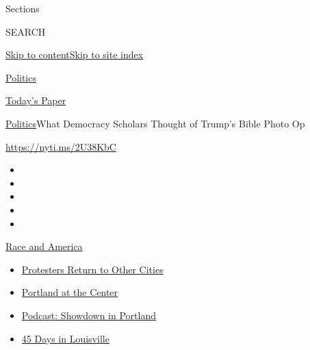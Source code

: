 Sections

SEARCH

\protect\hyperlink{site-content}{Skip to
content}\protect\hyperlink{site-index}{Skip to site index}

\href{https://www.nytimes.com/section/politics}{Politics}

\href{https://myaccount.nytimes.com/auth/login?response_type=cookie\&client_id=vi}{}

\href{https://www.nytimes.com/section/todayspaper}{Today's Paper}

\href{/section/politics}{Politics}\textbar{}What Democracy Scholars
Thought of Trump's Bible Photo Op

\url{https://nyti.ms/2U38KbC}

\begin{itemize}
\item
\item
\item
\item
\item
\end{itemize}

\href{https://www.nytimes.com/news-event/george-floyd-protests-minneapolis-new-york-los-angeles?action=click\&pgtype=Article\&state=default\&region=TOP_BANNER\&context=storylines_menu}{Race
and America}

\begin{itemize}
\tightlist
\item
  \href{https://www.nytimes.com/2020/07/26/us/protests-portland-seattle-trump.html?action=click\&pgtype=Article\&state=default\&region=TOP_BANNER\&context=storylines_menu}{Protesters
  Return to Other Cities}
\item
  \href{https://www.nytimes.com/2020/07/24/us/portland-oregon-protests-white-race.html?action=click\&pgtype=Article\&state=default\&region=TOP_BANNER\&context=storylines_menu}{Portland
  at the Center}
\item
  \href{https://www.nytimes.com/2020/07/23/podcasts/the-daily/portland-protests.html?action=click\&pgtype=Article\&state=default\&region=TOP_BANNER\&context=storylines_menu}{Podcast:
  Showdown in Portland}
\item
  \href{https://www.nytimes.com/interactive/2020/07/16/us/black-lives-matter-protests-louisville-breonna-taylor.html?action=click\&pgtype=Article\&state=default\&region=TOP_BANNER\&context=storylines_menu}{45
  Days in Louisville}
\end{itemize}

